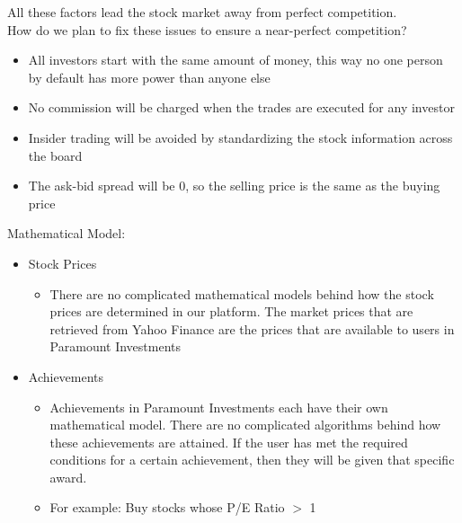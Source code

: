 All these factors lead the stock market away from perfect competition.\\

How do we plan to fix these issues to ensure a near-perfect competition?

\begin{itemize}
\item
All investors start with the same amount of money, this way no one person by default
has more power than anyone else
\item
No commission will be charged when the trades are executed for any investor
\item
Insider trading will be avoided by standardizing the stock information across the board
\item
The ask-bid spread will be 0, so the selling price is the same as the buying price
\end{itemize}

Mathematical Model:

\begin{itemize}
\item
Stock Prices
\begin{itemize}
\item
There are no complicated mathematical models behind how the stock prices are
determined in our platform.  The market prices that are retrieved from Yahoo Finance
are the prices that are available to users in Paramount Investments
\end{itemize}
\item
Achievements
\begin{itemize}
\item
Achievements in Paramount Investments each have their own mathematical model.
There are no complicated algorithms behind how these achievements are attained.
If the user has met the required conditions for a certain achievement, then they
will be given that specific award.
\item
For example: Buy stocks whose P/E Ratio $>$ 1
\end{itemize}
\end{itemize}

